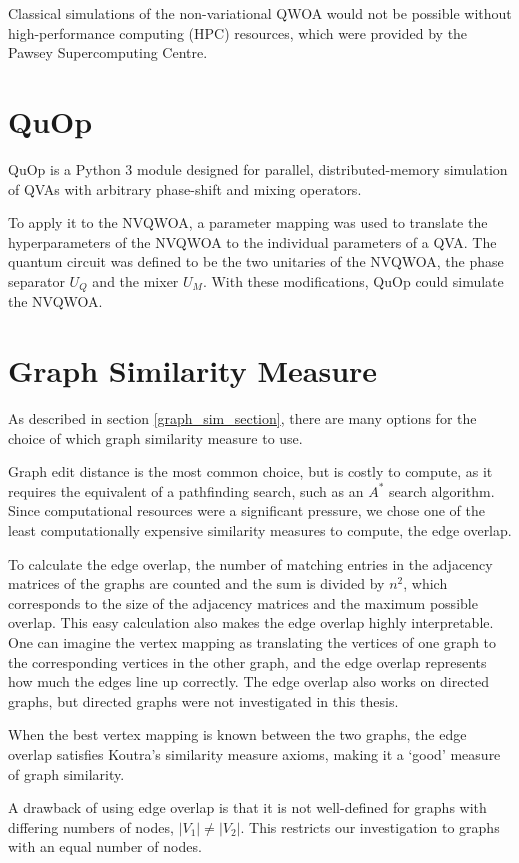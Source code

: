 Classical simulations of the non-variational QWOA would not be possible without high-performance computing (HPC) resources, which were provided by the Pawsey Supercomputing Centre.

\section{QuOp}
QuOp is a Python 3 module designed for parallel, distributed-memory simulation of QVAs with arbitrary phase-shift and mixing operators. 

To apply it to the NVQWOA, a parameter mapping was used to translate the hyperparameters of the NVQWOA to the individual parameters of a QVA. The quantum circuit was defined to be the two unitaries of the NVQWOA, the phase separator $U_Q$ and the mixer $U_M$. With these modifications, QuOp could simulate the NVQWOA.

\section{Graph Similarity Measure}
As described in section \ref{graph_sim_section}, there are many options for the choice of which graph similarity measure to use.

Graph edit distance is the most common choice, but is costly to compute, as it requires the equivalent of a pathfinding search, such as an $A^*$ search algorithm.
Since computational resources were a significant pressure, we chose one of the least computationally expensive similarity measures to compute, the edge overlap.

To calculate the edge overlap, the number of matching entries in the adjacency matrices of the graphs are counted and the sum is divided by $n^2$, which corresponds to the size of the adjacency matrices and the maximum possible overlap. This easy calculation also makes the edge overlap highly interpretable. One can imagine the vertex mapping as translating the vertices of one graph to the corresponding vertices in the other graph, and the edge overlap represents how much the edges line up correctly. The edge overlap also works on directed graphs, but directed graphs were not investigated in this thesis.

When the best vertex mapping is known between the two graphs, the edge overlap satisfies Koutra's similarity measure axioms, making it a `good' measure of graph similarity.

A drawback of using edge overlap is that it is not well-defined for graphs with differing numbers of nodes, $|V_1|\neq|V_2|$. This restricts our investigation to graphs with an equal number of nodes.

